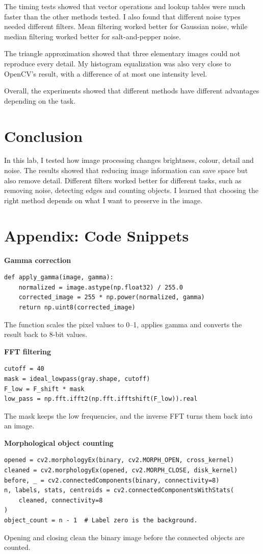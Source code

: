 \documentclass[11pt,a4paper]{article}
\begin{document}
The timing tests showed that vector operations and lookup tables were much faster than the other methods tested. I also found that different noise types needed different filters. Mean filtering worked better for Gaussian noise, while median filtering worked better for salt-and-pepper noise.

The triangle approximation showed that three elementary images could not reproduce every detail. My histogram equalization was also very close to OpenCV's result, with a difference of at most one intensity level.

Overall, the experiments showed that different methods have different advantages depending on the task.

\section{Conclusion}
In this lab, I tested how image processing changes brightness, colour, detail and noise. The results showed that reducing image information can save space but also remove detail. Different filters worked better for different tasks, such as removing noise, detecting edges and counting objects. I learned that choosing the right method depends on what I want to preserve in the image.

\section*{Appendix: Code Snippets}
\textbf{Gamma correction}
\begin{verbatim}
def apply_gamma(image, gamma):
    normalized = image.astype(np.float32) / 255.0
    corrected_image = 255 * np.power(normalized, gamma)
    return np.uint8(corrected_image)
\end{verbatim}
The function scales the pixel values to 0--1, applies gamma and converts the result back to 8-bit values.

\textbf{FFT filtering}
\begin{verbatim}
cutoff = 40
mask = ideal_lowpass(gray.shape, cutoff)
F_low = F_shift * mask
low_pass = np.fft.ifft2(np.fft.ifftshift(F_low)).real
\end{verbatim}
The mask keeps the low frequencies, and the inverse FFT turns them back into an image.

\textbf{Morphological object counting}
\begin{verbatim}
opened = cv2.morphologyEx(binary, cv2.MORPH_OPEN, cross_kernel)
cleaned = cv2.morphologyEx(opened, cv2.MORPH_CLOSE, disk_kernel)
before, _ = cv2.connectedComponents(binary, connectivity=8)
n, labels, stats, centroids = cv2.connectedComponentsWithStats(
    cleaned, connectivity=8
)
object_count = n - 1  # Label zero is the background.
\end{verbatim}
Opening and closing clean the binary image before the connected objects are counted.
\end{document}
